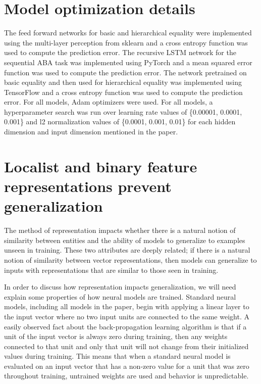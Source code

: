 \documentclass[12pt]{article}
\begin{document}

\section{Model optimization details}

The feed forward networks for basic and hierarchical equality were implemented using the multi-layer perception from sklearn and a cross entropy function was used to compute the prediction error. The recursive LSTM network for the sequential ABA task was implemented using PyTorch and a mean squared error function was used to compute the prediction error. The network pretrained on basic equality and then used for hierarchical equality was implemented using TensorFlow and a cross entropy function was used to compute the prediction error. For all models, Adam optimizers were used. For all models, a hyperparameter search was run over learning rate values of \{0.00001, 0.0001, 0.001\} and l2 normalization values of \{0.0001, 0.001, 0.01\} for each hidden dimension and input dimension mentioned in the paper.



\section{Localist and binary feature representations prevent generalization}

The method of representation impacts whether there is a natural notion of similarity between entities and the ability of models to generalize to examples unseen in training. These two attributes are deeply related; if there is a natural notion of similarity between vector representations, then models can generalize to inputs with representations that are similar to those seen in training.

In order to discuss how representation impacts generalization, we will need explain some properties of how neural models are trained. Standard neural models, including all models in the paper, begin with applying a linear layer to the input vector where no two input units are connected to the same weight. A easily observed fact about the back-propagation learning algorithm is that if a unit of the input vector is always zero during training, then any weights connected to that unit and only that unit will not change from their initialized values during training. This means that when a standard neural model is evaluated on an input vector that has a non-zero value for a unit that was zero throughout training, untrained weights are used and behavior is unpredictable.
\end{document}
